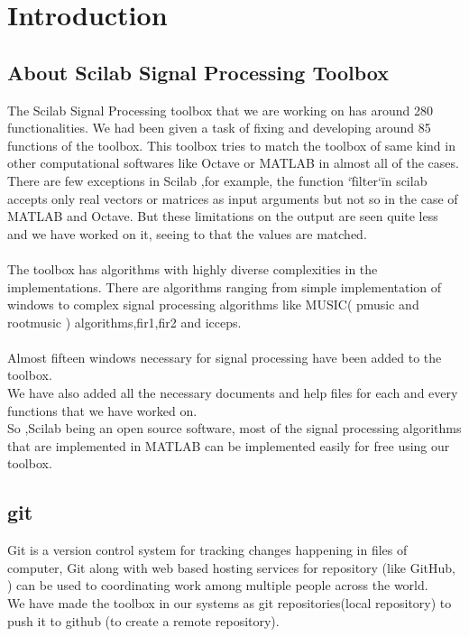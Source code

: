 \documentclass[12pt,a4paper]{report}
\begin{document}
\tableofcontents

\chapter{\textbf{Introduction}}

\section{About Scilab Signal Processing Toolbox}
The Scilab Signal Processing toolbox that we are working on has around 280 functionalities. We had been given a task of fixing and developing around 85 functions of the toolbox. 
This toolbox tries to match the toolbox of same kind in other computational softwares like Octave or MATLAB in almost all of the cases. There are few exceptions in Scilab ,for example, the function \char`\"filter\char`\" in scilab accepts only real vectors or matrices as input arguments but not so in the case of MATLAB and Octave. But these limitations on the output are seen quite less and we have worked on it, seeing to that the values are matched. \\
\\
The toolbox has algorithms with highly diverse complexities in the implementations. There are algorithms ranging from simple implementation of windows to complex signal processing algorithms like MUSIC( pmusic and rootmusic ) algorithms,fir1,fir2 and icceps.
\\
\\
Almost fifteen windows necessary for signal processing have been added to the toolbox.\\
We have also added all the necessary documents and help files for each and every functions that we have worked on.\\
So ,Scilab being an open source software, most of the signal processing algorithms that are implemented in MATLAB can be implemented easily for free using our toolbox.  


\section{git}
Git is a version control system for tracking changes happening in files of computer, Git along with web based hosting services for repository (like GitHub, ) can be used to coordinating work among multiple people across the world.\\
We have made the toolbox in our systems as git repositories(local repository) to push it to github (to create a remote repository).
\end{document}
